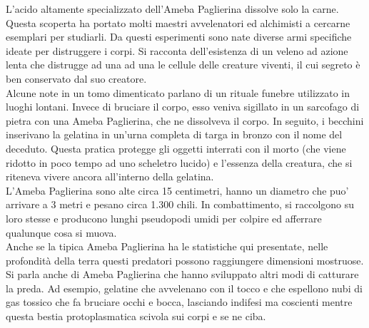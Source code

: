 \begin{multicols}{2}
L’acido altamente specializzato dell'Ameba Paglierina dissolve solo la carne. Questa scoperta ha portato molti maestri avvelenatori ed alchimisti a cercarne esemplari per studiarli. Da questi esperimenti sono nate diverse armi specifiche ideate per distruggere i corpi. Si racconta dell’esistenza di un veleno ad azione lenta che distrugge ad una ad una le cellule delle creature viventi, il cui segreto è ben conservato dal suo creatore.\\

Alcune note in un tomo dimenticato parlano di un rituale funebre utilizzato in luoghi lontani. Invece di bruciare il corpo, esso veniva sigillato in un sarcofago di pietra con una Ameba Paglierina, che ne dissolveva il corpo. In seguito, i becchini inserivano la gelatina in un’urna completa di targa in bronzo con il nome del deceduto. Questa pratica protegge gli oggetti interrati con il morto (che viene ridotto in poco tempo ad uno scheletro lucido) e l’essenza della creatura, che si riteneva vivere ancora all’interno della gelatina.\\

L'Ameba Paglierina sono alte circa 15 centimetri, hanno un diametro che puo' arrivare a 3 metri e pesano circa 1.300 chili. In combattimento, si raccolgono su loro stesse e producono lunghi pseudopodi umidi per colpire ed afferrare qualunque cosa si muova.\\

Anche se la tipica Ameba Paglierina ha le statistiche qui presentate, nelle profondità della terra questi predatori possono raggiungere dimensioni mostruose. Si parla anche di Ameba Paglierina che hanno sviluppato altri modi di catturare la preda. Ad esempio, gelatine che avvelenano con il tocco e che espellono nubi di gas tossico che fa bruciare occhi e bocca, lasciando indifesi ma coscienti mentre questa bestia protoplasmatica scivola sui corpi e se ne ciba.


\end{multicols}
